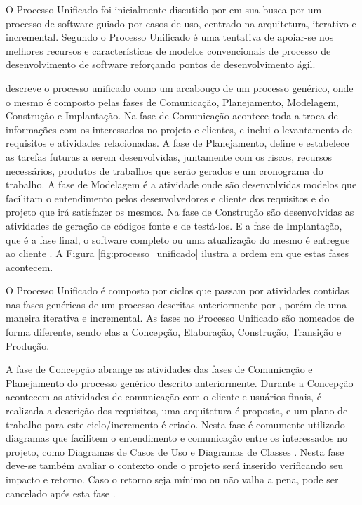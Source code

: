 O Processo Unificado foi inicialmente discutido por  em sua busca por um processo de software guiado por casos de uso, centrado na arquitetura, iterativo e incremental. Segundo  o Processo Unificado é uma tentativa de apoiar-se nos melhores recursos e características de modelos convencionais de processo de desenvolvimento de software reforçando pontos de desenvolvimento ágil.

 descreve o processo unificado como um arcabouço de um processo genérico, onde o mesmo é composto pelas fases de Comunicação, Planejamento, Modelagem, Construção e Implantação. Na fase de Comunicação acontece toda a troca de informações com os interessados no projeto e clientes, e inclui o levantamento de requisitos e atividades relacionadas. A fase de Planejamento, define e estabelece as tarefas futuras a serem desenvolvidas, juntamente com os riscos, recursos necessários, produtos de trabalhos que serão gerados e um cronograma do trabalho. A fase de Modelagem é a atividade onde são desenvolvidas modelos que facilitam o entendimento pelos desenvolvedores e cliente dos requisitos e do projeto que irá satisfazer os mesmos. Na fase de Construção são desenvolvidas as atividades de geração de códigos fonte e de testá-los. E a fase de Implantação, que é a fase final, o software completo ou uma atualização do mesmo é entregue ao cliente \cite{pressman06}. A Figura \ref{fig:processo_unificado} ilustra a ordem em que estas fases acontecem.

O Processo Unificado é composto por ciclos que passam por atividades contidas nas fases genéricas de um processo descritas anteriormente por , porém de uma maneira iterativa e incremental. As fases no Processo Unificado são nomeados de forma diferente, sendo elas a Concepção, Elaboração, Construção, Transição e Produção.

A fase de Concepção abrange as atividades das fases de Comunicação e Planejamento do processo genérico descrito anteriormente. Durante a Concepção acontecem as atividades de comunicação com o cliente e usuários finais, é realizada a descrição dos requisitos, uma arquitetura é proposta, e um plano de trabalho para este ciclo/incremento é criado. Nesta fase é comumente utilizado diagramas que facilitem o entendimento e comunicação entre os interessados no projeto, como Diagramas de Casos de Uso e Diagramas de Classes \cite{pressman06}. Nesta fase deve-se também avaliar o contexto onde o projeto será inserido verificando seu impacto e retorno. Caso o retorno seja mínimo ou não valha a pena, pode ser cancelado após esta fase \cite{sommerville10}.

